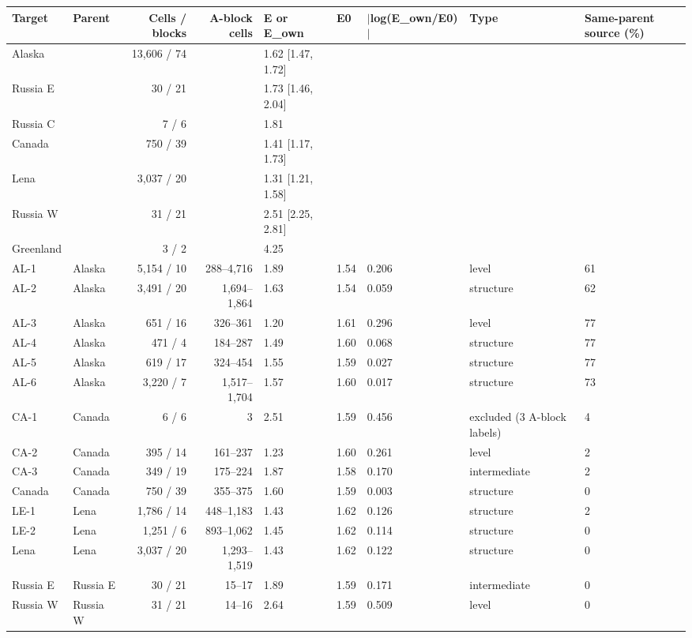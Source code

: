 \begin{tabular}{llrrlllll}
\toprule
Target & Parent & Cells / blocks & A-block cells & E or E\_own & E0 & $|$log(E\_own/E0)$|$ & Type & Same-parent source (\%) \\
\midrule
Alaska &  & 13,606 / 74 &  & 1.62 [1.47, 1.72] &  &  &  &  \\
Russia E &  & 30 / 21 &  & 1.73 [1.46, 2.04] &  &  &  &  \\
Russia C &  & 7 / 6 &  & 1.81 &  &  &  &  \\
Canada &  & 750 / 39 &  & 1.41 [1.17, 1.73] &  &  &  &  \\
Lena &  & 3,037 / 20 &  & 1.31 [1.21, 1.58] &  &  &  &  \\
Russia W &  & 31 / 21 &  & 2.51 [2.25, 2.81] &  &  &  &  \\
Greenland &  & 3 / 2 &  & 4.25 &  &  &  &  \\
AL-1 & Alaska & 5,154 / 10 & 288–4,716 & 1.89 & 1.54 & 0.206 & level & 61 \\
AL-2 & Alaska & 3,491 / 20 & 1,694–1,864 & 1.63 & 1.54 & 0.059 & structure & 62 \\
AL-3 & Alaska & 651 / 16 & 326–361 & 1.20 & 1.61 & 0.296 & level & 77 \\
AL-4 & Alaska & 471 / 4 & 184–287 & 1.49 & 1.60 & 0.068 & structure & 77 \\
AL-5 & Alaska & 619 / 17 & 324–454 & 1.55 & 1.59 & 0.027 & structure & 77 \\
AL-6 & Alaska & 3,220 / 7 & 1,517–1,704 & 1.57 & 1.60 & 0.017 & structure & 73 \\
CA-1 & Canada & 6 / 6 & 3 & 2.51 & 1.59 & 0.456 & excluded (3 A-block labels) & 4 \\
CA-2 & Canada & 395 / 14 & 161–237 & 1.23 & 1.60 & 0.261 & level & 2 \\
CA-3 & Canada & 349 / 19 & 175–224 & 1.87 & 1.58 & 0.170 & intermediate & 2 \\
Canada & Canada & 750 / 39 & 355–375 & 1.60 & 1.59 & 0.003 & structure & 0 \\
LE-1 & Lena & 1,786 / 14 & 448–1,183 & 1.43 & 1.62 & 0.126 & structure & 2 \\
LE-2 & Lena & 1,251 / 6 & 893–1,062 & 1.45 & 1.62 & 0.114 & structure & 0 \\
Lena & Lena & 3,037 / 20 & 1,293–1,519 & 1.43 & 1.62 & 0.122 & structure & 0 \\
Russia E & Russia E & 30 / 21 & 15–17 & 1.89 & 1.59 & 0.171 & intermediate & 0 \\
Russia W & Russia W & 31 / 21 & 14–16 & 2.64 & 1.59 & 0.509 & level & 0 \\
\bottomrule
\end{tabular}
